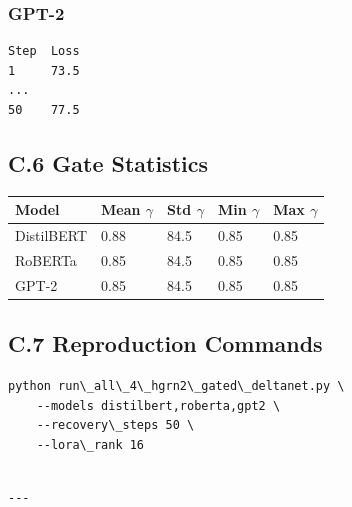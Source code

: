 \subsubsection{GPT-2}
\begin{lstlisting}
Step  Loss
1     73.5
...
50    77.5
\end{lstlisting}

\subsection{C.6 Gate Statistics}

\begin{table}[H]
\centering
\small
\begin{tabular}{lllll}
\toprule
\textbf{Model} & \textbf{Mean $\gamma$} & \textbf{Std $\gamma$} & \textbf{Min $\gamma$} & \textbf{Max $\gamma$} \\
\midrule
DistilBERT & 0.88 & 84.5 & 0.85 & 0.85 \\
RoBERTa & 0.85 & 84.5 & 0.85 & 0.85 \\
GPT-2 & 0.85 & 84.5 & 0.85 & 0.85 \\
\bottomrule
\end{tabular}
\end{table}

\subsection{C.7 Reproduction Commands}

\begin{lstlisting}
python run\_all\_4\_hgrn2\_gated\_deltanet.py \
    --models distilbert,roberta,gpt2 \
    --recovery\_steps 50 \
    --lora\_rank 16
\end{lstlisting}
\begin{lstlisting}

---
\end{lstlisting}